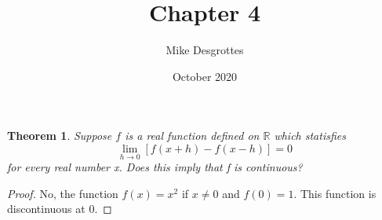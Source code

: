 \documentclass{article}
\title{Chapter 4}
\author{Mike Desgrottes}
\date{October 2020}
\theoremstyle{plain}
\newtheorem{theorem}{Theorem}
\theoremstyle{definition}
\begin{document}
\maketitle

\begin{theorem}
	Suppose $f$ is a real function defined on $\mathbb{R}$ which statisfies $$\lim_{h \to 0} [f(x + h) - f(x - h)]= 0 $$ for every real number x. Does this imply that f is continuous?
\end{theorem}

\begin{proof}
	No, the function $f(x) = x^2$ if $x \not = 0$ and $f(0) = 1$. This function is discontinuous at 0.
\end{proof}
\end{document}
